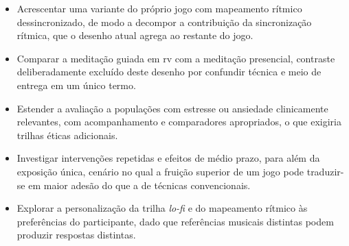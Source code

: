 \begin{itemize}
    \item Acrescentar uma variante do próprio jogo com mapeamento rítmico dessincronizado, de modo a decompor a contribuição da sincronização rítmica, que o desenho atual agrega ao restante do jogo.
    \item Comparar a meditação guiada em \gls{rv} com a meditação presencial, contraste deliberadamente excluído deste desenho por confundir técnica e meio de entrega em um único termo.
    \item Estender a avaliação a populações com estresse ou ansiedade clinicamente relevantes, com acompanhamento e comparadores apropriados, o que exigiria trilhas éticas adicionais.
    \item Investigar intervenções repetidas e efeitos de médio prazo, para além da exposição única, cenário no qual a fruição superior de um jogo pode traduzir-se em maior adesão do que a de técnicas convencionais.
    \item Explorar a personalização da trilha \textit{lo-fi} e do mapeamento rítmico às preferências do participante, dado que referências musicais distintas podem produzir respostas distintas.
\end{itemize}
